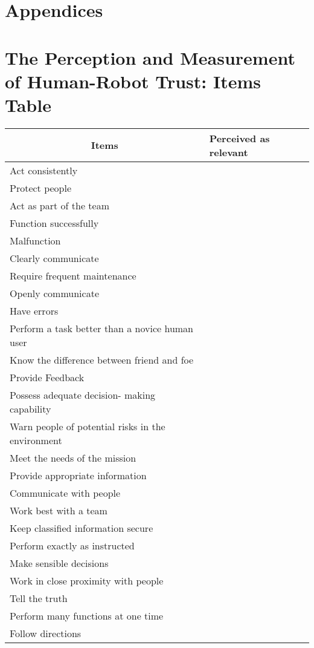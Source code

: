 \section*{Appendices}
\section{The Perception and Measurement of Human-Robot Trust: Items Table}
\label{app:measurement.items.table}	
\begin{longtable}{l|l}
	\multicolumn{1}{c|}{\textbf{Items}} & \textbf{Perceived as relevant} \\ \hline
	\endhead
	Act consistently & \\ \hline
	Protect people & \\ \hline
	Act as part of the team & \\ \hline
	Function successfully & \\ \hline
	Malfunction & \\ \hline
	Clearly communicate & \\ \hline
	Require frequent maintenance & \\ \hline
	Openly communicate & \\ \hline
	Have errors & \\ \hline
	Perform a task better than a novice human user & \\ \hline
	Know the difference between friend and foe & \\ \hline
	Provide Feedback & \\ \hline
	Possess adequate decision- making capability & \\ \hline
	Warn people of potential risks in the environment & \\ \hline
	Meet the needs of the mission & \\ \hline
	Provide appropriate information & \\ \hline
	Communicate with people & \\ \hline
	Work best with a team & \\ \hline
	Keep classified information secure & \\ \hline
	Perform exactly as instructed & \\ \hline
	Make sensible decisions & \\ \hline
	Work in close proximity with people & \\ \hline
	Tell the truth & \\ \hline
	Perform many functions at one time & \\ \hline
	Follow directions & \\ \hline

\end{longtable}
